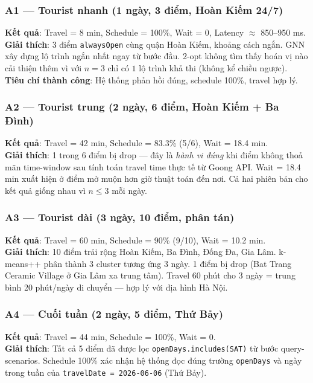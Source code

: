 \documentclass[12pt,a4paper]{article}
\begin{document}
\subsubsection*{A1 --- Tourist nhanh (1 ngày, 3 điểm, Hoàn Kiếm 24/7)}
\begin{tcolorbox}[scenbox]
\textbf{Kết quả}: Travel = 8 min, Schedule = 100\%, Wait = 0, Latency $\approx$ 850--950 ms.\\
\textbf{Giải thích}: 3 điểm \texttt{alwaysOpen} cùng quận Hoàn Kiếm, khoảng cách ngắn.
GNN xây dựng lộ trình ngắn nhất ngay từ bước đầu. 2-opt không tìm thấy hoán vị nào cải thiện thêm
vì với $n=3$ chỉ có $1$ lộ trình khả thi (không kể chiều ngược).
\textbf{Tiêu chí thành công}: Hệ thống phản hồi đúng, schedule 100\%, travel hợp lý.
\end{tcolorbox}

\subsubsection*{A2 --- Tourist trung (2 ngày, 6 điểm, Hoàn Kiếm + Ba Đình)}
\begin{tcolorbox}[scenbox]
\textbf{Kết quả}: Travel = 42 min, Schedule = 83.3\% (5/6), Wait = 18.4 min.\\
\textbf{Giải thích}: 1 trong 6 điểm bị drop --- đây là \textit{hành vi đúng} khi điểm không thoả mãn
time-window sau tính toán travel time thực tế từ Goong API. Wait = 18.4 min xuất hiện ở điểm mở muộn
hơn giờ thuật toán đến nơi. Cả hai phiên bản cho kết quả giống nhau vì $n \leq 3$ mỗi ngày.
\end{tcolorbox}

\subsubsection*{A3 --- Tourist dài (3 ngày, 10 điểm, phân tán)}
\begin{tcolorbox}[scenbox]
\textbf{Kết quả}: Travel = 60 min, Schedule = 90\% (9/10), Wait = 10.2 min.\\
\textbf{Giải thích}: 10 điểm trải rộng Hoàn Kiếm, Ba Đình, Đống Đa, Gia Lâm. k-means++ phân thành
3 cluster tương ứng 3 ngày. 1 điểm bị drop (Bat Trang Ceramic Village ở Gia Lâm xa trung tâm).
Travel 60 phút cho 3 ngày = trung bình 20 phút/ngày di chuyển --- hợp lý với địa hình Hà Nội.
\end{tcolorbox}

\subsubsection*{A4 --- Cuối tuần (2 ngày, 5 điểm, Thứ Bảy)}
\begin{tcolorbox}[scenbox]
\textbf{Kết quả}: Travel = 44 min, Schedule = 100\%, Wait = 0.\\
\textbf{Giải thích}: Tất cả 5 điểm đã được lọc \texttt{openDays.includes(SAT)} từ bước query-scenarios.
Schedule 100\% xác nhận hệ thống đọc đúng trường \texttt{openDays} và ngày trong tuần của
\texttt{travelDate = 2026-06-06} (Thứ Bảy).
\end{tcolorbox}
\end{document}
